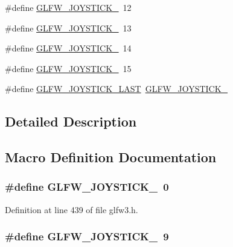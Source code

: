 \begin{DoxyCompactItemize}
\#define \hyperlink{group__joysticks_ga5c84fb4e49bf661d7d7c78eb4018c508}{G\-L\-F\-W\-\_\-\-J\-O\-Y\-S\-T\-I\-C\-K\-\_}~12
\item 
\#define \hyperlink{group__joysticks_ga89540873278ae5a42b3e70d64164dc74}{G\-L\-F\-W\-\_\-\-J\-O\-Y\-S\-T\-I\-C\-K\-\_}~13
\item 
\#define \hyperlink{group__joysticks_ga7b02ab70daf7a78bcc942d5d4cc1dcf9}{G\-L\-F\-W\-\_\-\-J\-O\-Y\-S\-T\-I\-C\-K\-\_}~14
\item 
\#define \hyperlink{group__joysticks_ga453edeeabf350827646b6857df4f80ce}{G\-L\-F\-W\-\_\-\-J\-O\-Y\-S\-T\-I\-C\-K\-\_}~15
\item 
\#define \hyperlink{group__joysticks_ga9ca13ebf24c331dd98df17d84a4b72c9}{G\-L\-F\-W\-\_\-\-J\-O\-Y\-S\-T\-I\-C\-K\-\_\-\-L\-A\-S\-T}~\hyperlink{group__joysticks_ga453edeeabf350827646b6857df4f80ce}{G\-L\-F\-W\-\_\-\-J\-O\-Y\-S\-T\-I\-C\-K\-\_}
\end{DoxyCompactItemize}


\subsection{Detailed Description}


\subsection{Macro Definition Documentation}
\hypertarget{group__joysticks_ga34a0443d059e9f22272cd4669073f73d}{
\subsubsection[{G\-L\-F\-W\-\_\-\-J\-O\-Y\-S\-T\-I\-C\-K\-\_\-1}]{\setlength{\rightskip}{0pt plus 5cm}\#define G\-L\-F\-W\-\_\-\-J\-O\-Y\-S\-T\-I\-C\-K\-\_~0}}\label{group__joysticks_ga34a0443d059e9f22272cd4669073f73d}


Definition at line 439 of file glfw3.\-h.

\hypertarget{group__joysticks_gaef55389ee605d6dfc31aef6fe98c54ec}{
\subsubsection[{G\-L\-F\-W\-\_\-\-J\-O\-Y\-S\-T\-I\-C\-K\-\_\-10}]{\setlength{\rightskip}{0pt plus 5cm}\#define G\-L\-F\-W\-\_\-\-J\-O\-Y\-S\-T\-I\-C\-K\-\_~9}}\label{group__joysticks_gaef55389ee605d6dfc31aef6fe98c54ec}


